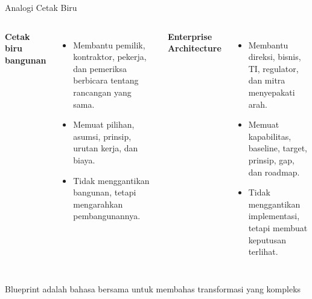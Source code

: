 \documentclass[aspectratio=169, table]{beamer}
\newcommand{\takeaway}[1]{%
  \vspace{4pt}
  {\footnotesize #1}
}
\begin{document}
\begin{frame}{Analogi Cetak Biru}
  \vspace{8pt}
  \begin{columns}[t]
    \textbf{Cetak biru bangunan}
    \vspace{4pt}
    \begin{itemize}
      \item Membantu pemilik, kontraktor, pekerja, dan pemeriksa berbicara tentang rancangan yang sama.
      \item Memuat pilihan, asumsi, prinsip, urutan kerja, dan biaya.
      \item Tidak menggantikan bangunan, tetapi mengarahkan pembangunannya.
    \end{itemize}

    \textbf{Enterprise Architecture}
    \vspace{4pt}
    \begin{itemize}
      \item Membantu direksi, bisnis, TI, regulator, dan mitra menyepakati arah.
      \item Memuat kapabilitas, baseline, target, prinsip, gap, dan roadmap.
      \item Tidak menggantikan implementasi, tetapi membuat keputusan terlihat.
    \end{itemize}
  \end{columns}

  \takeaway{Blueprint adalah bahasa bersama untuk membahas transformasi yang kompleks}
\end{frame}
\end{document}
